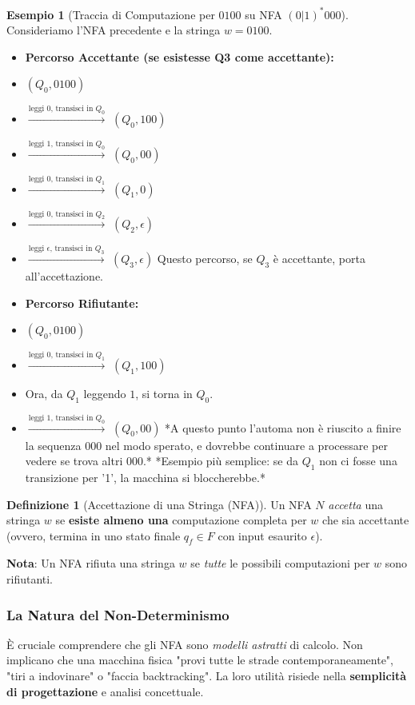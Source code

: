 \documentclass[a4paper]{article}
\theoremstyle{definition} %
\newtheorem{definition}{Definizione}[section]
\newtheorem{example}{Esempio}[section]
\begin{document}
\begin{example}[Traccia di Computazione per $0100$ su NFA $(0|1)^*000$]
Consideriamo l'NFA precedente e la stringa $w = 0100$.
\begin{itemize}
    \item \textbf{Percorso Accettante (se esistesse Q3 come accettante):}
    \item $(Q_0, 0100)$
    \item $\xrightarrow{\text{leggi 0, transisci in } Q_0}$ $(Q_0, 100)$
    \item $\xrightarrow{\text{leggi 1, transisci in } Q_0}$ $(Q_0, 00)$
    \item $\xrightarrow{\text{leggi 0, transisci in } Q_1}$ $(Q_1, 0)$
    \item $\xrightarrow{\text{leggi 0, transisci in } Q_2}$ $(Q_2, \epsilon)$
    \item $\xrightarrow{\text{leggi } \epsilon \text{, transisci in } Q_3}$ $(Q_3, \epsilon)$
    Questo percorso, se $Q_3$ è accettante, porta all'accettazione.

    \item \textbf{Percorso Rifiutante:}
    \item $(Q_0, 0100)$
    \item $\xrightarrow{\text{leggi 0, transisci in } Q_1}$ $(Q_1, 100)$
    \item Ora, da $Q_1$ leggendo $1$, si torna in $Q_0$.
    \item $\xrightarrow{\text{leggi 1, transisci in } Q_0}$ $(Q_0, 00)$
    *A questo punto l'automa non è riuscito a finire la sequenza $000$ nel modo sperato, e dovrebbe continuare a processare per vedere se trova altri $000$.*
    *Esempio più semplice: se da $Q_1$ non ci fosse una transizione per '1', la macchina si bloccherebbe.*
\end{itemize}
\end{example}

\begin{definition}[Accettazione di una Stringa (NFA)]
Un NFA $N$ \emph{accetta} una stringa $w$ se \textbf{esiste almeno una} computazione completa per $w$ che sia accettante (ovvero, termina in uno stato finale $q_f \in F$ con input esaurito $\epsilon$).
\end{definition}
\noindent \textbf{Nota}: Un NFA rifiuta una stringa $w$ se \emph{tutte} le possibili computazioni per $w$ sono rifiutanti.

\subsubsection{La Natura del Non-Determinismo}
È cruciale comprendere che gli NFA sono \emph{modelli astratti} di calcolo. Non implicano che una macchina fisica "provi tutte le strade contemporaneamente", "tiri a indovinare" o "faccia backtracking". La loro utilità risiede nella \textbf{semplicità di progettazione} e analisi concettuale.
\end{document}
